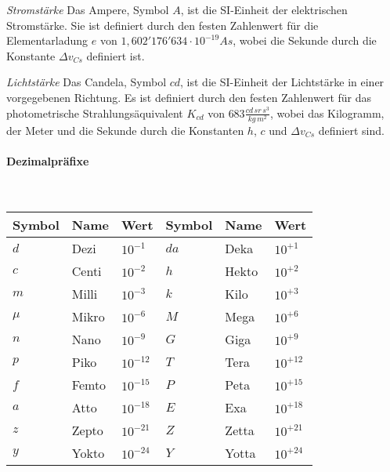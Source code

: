 \textit{Stromstärke}\linebreak
Das Ampere, Symbol $A$, ist die SI-Einheit der elektrischen Stromstärke. Sie ist definiert
durch den festen Zahlenwert für die Elementarladung $e$ von $1,602'176'634\cdot10^{-19}As$,
wobei die Sekunde durch die Konstante $\Delta{v_{Cs}}$ definiert ist.
\vspace{1mm}

\textit{Lichtstärke}\linebreak
Das Candela, Symbol $cd$, ist die SI-Einheit der Lichtstärke in einer vorgegebenen Richtung.
Es ist definiert durch den festen Zahlenwert für das photometrische Strahlungsäquivalent
$K_{cd}$ von $683\frac{cd\,sr\,s^3}{kg\,m^2}$, wobei das Kilogramm, der Meter und die Sekunde
durch die Konstanten $h$, $c$ und $\Delta{v_{Cs}}$ definiert sind.
\vspace{1mm}

\paragraph{Dezimalpräfixe}\mbox{}\\
\begin{tabularx}{\columnwidth}{@{}lXl|XlX@{}}
	\hline
	Symbol & Name  & Wert         & Symbol & Name  & Wert         \\ \hline
	$d$    & Dezi  & $ 10^{-1} 	$  & $da$   & Deka  & $ 10^{+1}  $ \\ \hline
	$c$    & Centi & $ 10^{-2} 	$  & $h$    & Hekto & $ 10^{+2}  $ \\ \hline
	$m$    & Milli & $ 10^{-3} 	$  & $k$    & Kilo  & $ 10^{+3}  $ \\ \hline
	$\mu$  & Mikro & $ 10^{-6} 	$  & $M$    & Mega  & $ 10^{+6}  $ \\ \hline
	$n$    & Nano  & $ 10^{-9} 	$  & $G$    & Giga  & $ 10^{+9}  $ \\ \hline
	$p$    & Piko  & $ 10^{-12} $ & $T$    & Tera  & $ 10^{+12} $ \\ \hline
	$f$    & Femto & $ 10^{-15} $ & $P$    & Peta  & $ 10^{+15} $ \\ \hline
	$a$    & Atto  & $ 10^{-18} $ & $E$    & Exa   & $ 10^{+18} $ \\ \hline
	$z$    & Zepto & $ 10^{-21} $ & $Z$    & Zetta & $ 10^{+21} $ \\ \hline
	$y$    & Yokto & $ 10^{-24} $ & $Y$    & Yotta & $ 10^{+24} $ \\ \hline
\end{tabularx}
\vspace{1mm}

